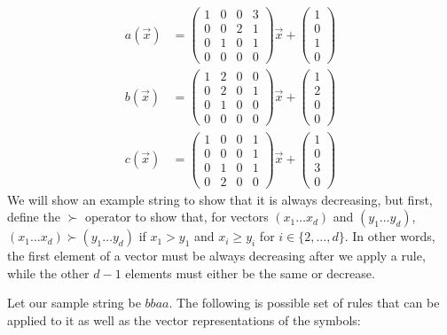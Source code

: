 \begin{align*}
a(\Vec{x}) &= \begin{pmatrix}
1&0&0&3\\
0&0&2&1\\
0&1&0&1\\
0&0&0&0
\end{pmatrix} \Vec{x} + \begin{pmatrix}
1\\
0\\
1\\
0
\end{pmatrix}\\
b(\Vec{x}) &= \begin{pmatrix}
1&2&0&0\\
0&2&0&1\\
0&1&0&0\\
0&0&0&0
\end{pmatrix} \Vec{x} + \begin{pmatrix}
1\\
2\\
0\\
0
\end{pmatrix}\\
c(\Vec{x}) &= \begin{pmatrix}
1&0&0&1\\
0&0&0&1\\
0&1&0&1\\
0&2&0&0
\end{pmatrix} \Vec{x} + \begin{pmatrix}
1\\
0\\
3\\
0
\end{pmatrix}
\end{align*}
We will show an example string to show that it is always decreasing, but first, define the $\succ$ operator to show that, for vectors $(x_1 \ldots x_d)$ and $(y_1 \ldots y_d)$, $(x_1 \ldots x_d) \succ (y_1 \ldots y_d)$ if $x_1 > y_1$ and $x_i \geq y_i$ for $i \in \{2, \ldots, d\}$. In other words, the first element of a vector must be always decreasing after we apply a rule, while the other $d-1$ elements must either be the same or decrease. \par
Let our sample string be $bbaa$. The following is possible set of rules that can be applied to it as well as the vector representations of the symbols: \par
